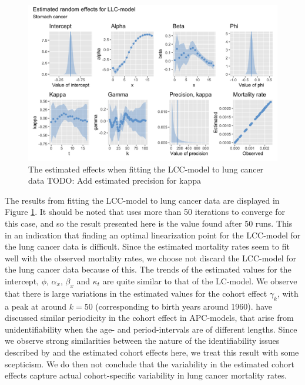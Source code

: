 \begin{figure}[h!]
    \centering
    \includegraphics[width=0.85\linewidth]{real-data/real-data-univariate/Figures/uv-full-data-lcc-l.png}
    \caption{The estimated effects when fitting the LCC-model to lung cancer data \textcolor{myDarkBlue}{TODO: Add estimated precision for kappa}}
    \label{fig:uv-full-data-LCC-l}
\end{figure}

\newpar The results from fitting the LCC-model to lung cancer data are displayed in Figure \ref{fig:uv-full-data-LCC-l}. It should be noted that \inlabru uses more than 50 iterations to converge for this case, and so the result presented here is the value found after 50 runs. This in an indication that finding an optimal linearization point for the LCC-model for the lung cancer data is difficult. Since the estimated mortality rates seem to fit well with the observed mortality rates, we choose not discard the LCC-model for the lung cancer data because of this. The trends of the estimated values for the intercept, $\phi$, $\alpha_x$, $\beta_x$ and $\kappa_t$ are quite similar to that of the LC-model. We observe that there is large variations in the estimated values for the cohort effect $\gamma_k$, with a peak at around $k = 50$ (corresponding to birth years around 1960). \textcite{RieblerThesis2010} have discussed similar periodicity in the cohort effect in APC-models, that arise from unidentifiability when the age- and period-intervals are of different lengths. Since we observe strong similarities between the nature of the identifiability issues described by \textcite{RieblerThesis2010} and the estimated cohort effects here, we treat this result with some scepticism. We do then not conclude that the variability in the estimated cohort effects capture actual cohort-specific variability in lung cancer mortality rates. 

